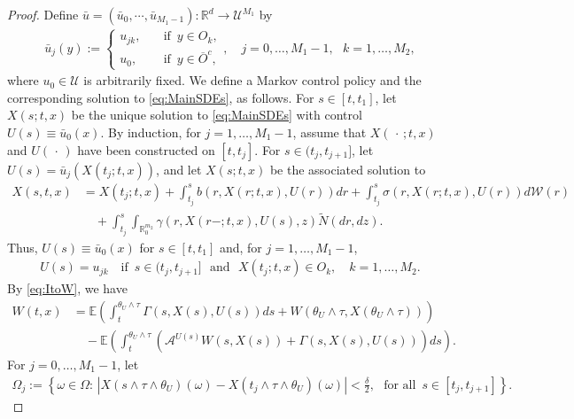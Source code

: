\documentclass[amscd,amssymb,11pt]{article}
\numberwithin{theorem}{section}
\numberwithin{equation}{section}
\begin{document}
\begin{proof}
Define $\bar{u}=(\bar{u}_{0},\cdots,\bar{u}_{M_{1}-1}):\mathbb{R}^{d}\rightarrow\mathcal{U}^{M_{1}}$ by
\begin{align*}
\bar{u}_{j}(y):=\left\{\begin{array}{ll} u_{jk},\quad &\text{if }\,y\in O_{k}, \\ u_{0},\quad &\text{if }\,y\in\overline{O}^{c},\end{array}\right.,\quad j=0,\ldots,M_{1}-1,\,\,\,\,k=1,\ldots,M_{2},
\end{align*}
where $u_{0}\in\mathcal{U}$ is arbitrarily fixed. We define a Markov control policy and the corresponding solution to \eqref{eq:MainSDEs}, as follows. For $s\in [t,t_{1}]$, let $X(s;t,x)$ be the unique solution to \eqref{eq:MainSDEs} with control $U(s)\equiv\bar{u}_{0}(x)$. By induction, for $j=1,\ldots,M_{1}-1$, assume that $X(\,\cdot\,;t,x)$ and $U(\,\cdot\,)$ have been constructed on $[t,t_{j}]$. For $s\in(t_{j},t_{j+1}]$, let $U(s)=\bar{u}_{j}(X(t_{j};t,x))$, and let $X(s;t,x)$ be the associated solution to
\begin{align*}
X(s,t,x)&=X(t_{j};t,x)+\int_{t_{j}}^{s}b\left(r,X(r;t,x),U(r)\right)dr+\int_{t_{j}}^{s}\sigma\left(r,X(r;t,x),U(r)\right)d\mathcal{W}(r)\\
&\quad +\int_{t_{j}}^{s}\int_{\mathbb{R}_{0}^{m_{2}}}\gamma\left(r,X(r-;t,x),U(s),z\right)\widetilde{N}(dr,dz).
\end{align*}
Thus, $U(s)\equiv\bar{u}_{0}(x)$ for $s\in[t,t_{1}]$ and, for $j=1,\ldots,M_{1}-1$,
\begin{align}\label{eq:MarkovControl}
U(s)=u_{jk}\quad\text{if }\,s\in (t_{j},t_{j+1}]\,\,\,\,\text{and}\,\,\,\, X(t_{j};t,x)\in O_{k},\quad k=1,\ldots,M_{2}.
\end{align}
By \eqref{eq:ItoW}, we have
\begin{align}
W(t,x)&=\mathbb{E}\left(\int_{t}^{\theta_{U}\wedge\tau}\Gamma\left(s,X(s),U(s)\right)ds+W\left(\theta_{U}\wedge\tau,X(\theta_{U}\wedge\tau)\right)\right)\nonumber\\
\label{eq:ItoW2} &\quad -\mathbb{E}\left(\int_{t}^{\theta_{U}\wedge\tau}\left(\mathscr{A}^{U(s)}W(s,X(s))+\Gamma\left(s,X(s),U(s)\right)\right)ds\right).
\end{align}
For $j=0,\ldots,M_{1}-1$, let
\begin{align*}
\Omega_{j}:=\left\{\omega\in\Omega:\,\left|X(s\wedge\tau\wedge\theta_{U})(\omega)-X(t_{j}\wedge\tau\wedge\theta_{U})(\omega)\right|<\frac{\delta}{2},\,\,\,\,\text{for all }\,s\in[t_{j},t_{j+1}]\right\}.
\end{align*}

\end{proof}
\end{document}

